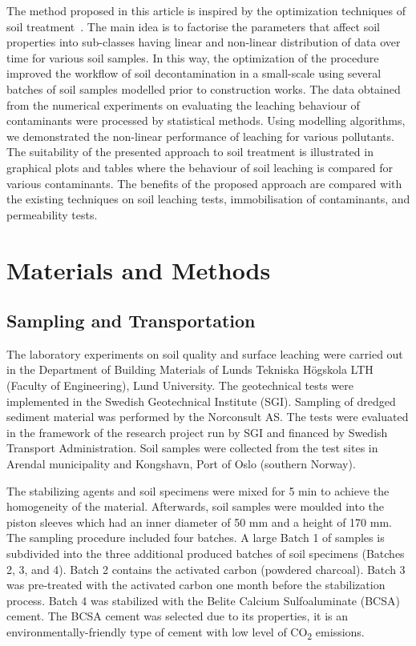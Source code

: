 \documentclass[algorithms,article,accept,pdftex,moreauthors]{Definitions/mdpi}
\begin{document}
{The} method {proposed in this article }is inspired by the optimization techniques of soil treatment~\cite{Lindh2001,geotechnics2010005,RehmanMoghal,Yin,Kennedy}{. The main idea is to }factorise {the} parameters that affect soil properties into sub-classes having linear and non-linear distribution of data over time for various soil samples. {In this way, }the optimization of the procedure improved the workflow {of soil decontamination }in {a }small-scale using several batches of soil samples {modelled }prior to  construction works. The data obtained from the numerical experiments on {evaluating the leaching behaviour of contaminants} were processed by statistical methods{. Using }modelling algorithms{, we demonstrated the} non-linear {performance} of leaching for various  pollutants. {The} suitability of {the presented} approach to soil treatment {is illustrated }in graphical plots and tables where the behaviour of soil leaching {is compared }for various contaminants.{ The }benefits of {the proposed} approach {are compared with the }existing techniques on soil leaching tests{, immobilisation of contaminants}, and permeability {tests}.

\section{{Materials and Methods}}

\subsection{{Sampling and Transportation}}

The laboratory experiments on soil quality {and surface leaching }were carried out {in} the Department of Building Materials {of} Lunds Tekniska Högskola LTH (Faculty of Engineering), Lund University. The {geotechnical }tests were {implemented in} the Swedish Geotechnical Institute (SGI). {Sampling of dredged sediment material was performed by} the Norconsult AS. The tests were {evaluated in the framework of} the research project run by SGI and financed by Swedish Transport Administration. {Soil} samples {were} collected from the test sites in Arendal municipality and Kongshavn{, Port of Oslo (southern Norway)}.

The stabilizing agents {and soil specimens }were mixed for 5 min to achieve {the }homogeneity of the material. Afterwards, {soil samples} were moulded into the piston sleeves {which} had an inner diameter of 50 mm and a height of 170 mm. The sampling procedure included four batches. A large Batch 1 of samples is subdivided into the three {additional} produced batches of soil {specimens} (Batches 2, 3, and 4). Batch 2 contains {the }activated carbon (powdered charcoal). Batch 3 was pre-treated with {the }activated carbon one month before the stabilization process{. }Batch 4 was stabilized with {the }Belite Calcium Sulfoaluminate (BCSA) cement. The BCSA cement was selected due to its properties, it is an environmentally-friendly type of cement with low level of %
CO\textsubscript{2} emissions.
\end{document}
